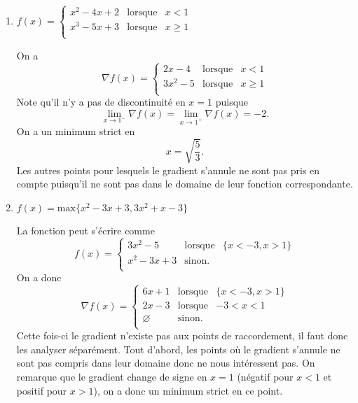 \begin{enumerate}
\begin{enumerate}
    \item 
    $f(x) = \left\{ \begin{array}{rcl}
             x^2-4x+2 & \mbox{lorsque} & x<1 \\ 
             x^3-5x+3 & \mbox{lorsque} & x \geq 1 \\
              \end{array}\right.$
      \begin{solution}
        On a
        \[ \nabla f(x) = \left\{ \begin{array}{rcl}
            2x-4 & \mbox{lorsque} & x<1 \\ 
            3x^2-5 & \mbox{lorsque} & x \geq 1 \\
              \end{array}\right. \]
        Note qu'il n'y a pas de discontinuité en $x=1$ puisque
        \[ \lim_{x\rightarrow 1^-} \nabla f(x)
           = \lim_{x\rightarrow 1^+} \nabla f(x) = -2. \]
        On a un minimum strict en 
        \[ x = \sqrt{\frac{5}{3}}. \]
        Les autres points pour lesquels le gradient s'annule
        ne sont pas pris en compte puisqu'il ne sont pas dans le domaine
        de leur fonction correspondante.
      \end{solution}
    
    \item $f(x) = \mbox{max}\{x^2 - 3x + 3, 3x^2 + x - 3\}$
      \begin{solution}
        La fonction peut s'écrire comme
        \[ f(x) = \left\{ \begin{array}{rcl}
            3x^2-5 & \mbox{lorsque} & \{x<-3,x>1\} \\
            x^2 - 3x + 3 & \mbox{sinon.} & \\ 
              \end{array}\right. \]
        On a donc
        \[ \nabla f(x) = \left\{ \begin{array}{rcl}
            6x+1 & \mbox{lorsque} & \{x<-3,x>1\} \\ 
            2x-3 & \mbox{lorsque} & -3<x<1 \\
            \varnothing & \mbox{sinon.} & \\            
              \end{array}\right. \]
        Cette fois-ci le gradient n'existe pas aux points de raccordement,
        il faut donc les analyser séparément.
        Tout d'abord, les points où le gradient s'annule
        ne sont pas compris dans leur domaine donc ne nous intéressent pas.
        On remarque que le gradient change de signe en $x=1$
        (négatif pour $x<1$ et positif pour $x>1$),
        on a donc un minimum strict en ce point.
      \end{solution}
              

\end{enumerate}
\end{enumerate}
